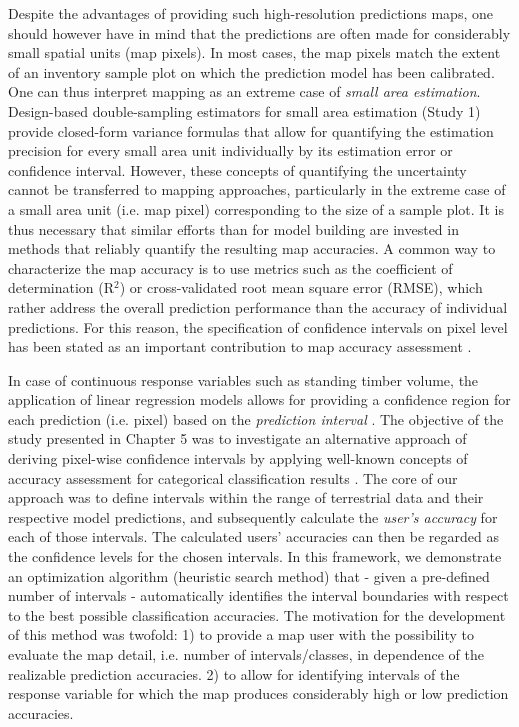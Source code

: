 Despite the advantages of providing such high-resolution predictions maps, one should however have in mind that the predictions are often made for considerably small spatial units (map pixels). In most cases, the map pixels match the extent of an inventory sample plot on which the prediction model has been calibrated. One can thus interpret mapping as an extreme case of \textit{small area estimation}. Design-based double-sampling estimators for small area estimation (Study 1) provide closed-form variance formulas that allow for quantifying the estimation precision for every small area unit individually by its estimation error or confidence interval. However, these concepts of quantifying the uncertainty cannot be transferred to mapping approaches, particularly in the extreme case of a small area unit (i.e. map pixel) corresponding to the size of a sample plot. It is thus necessary that similar efforts than for model building are invested in methods that reliably quantify the resulting map accuracies. A common way to characterize the map accuracy is to use metrics such as the coefficient of determination (R$^2$) or cross-validated root mean square error (RMSE), which rather address the overall prediction performance than the accuracy of individual predictions. For this reason, the specification of confidence intervals on pixel level has been stated as an important contribution to map accuracy assessment \citep{mcroberts2010a}.\par

In case of continuous response variables such as standing timber volume, the application of linear regression models allows for providing a confidence region for each prediction (i.e. pixel) based on the \textit{prediction interval} \citep[pp.136--139]{fahrmeir2013}. The objective of the study presented in Chapter 5 was to investigate an alternative approach of deriving pixel-wise confidence intervals by applying well-known concepts of accuracy assessment for categorical classification results \citep{congalton2008}. The core of our approach was to define intervals within the range of terrestrial data and their respective model predictions, and subsequently calculate the \textit{user's accuracy} for each of those intervals. The calculated users' accuracies can then be regarded as the confidence levels for the chosen intervals. In this framework, we demonstrate an optimization algorithm (heuristic search method) that - given a pre-defined number of intervals - automatically identifies the interval boundaries with respect to the best possible classification accuracies. The motivation for the development of this method was twofold: 1) to provide a map user with the possibility to evaluate the map detail, i.e. number of intervals/classes, in dependence of the realizable prediction accuracies. 2) to allow for identifying intervals of the response variable for which the map produces considerably high or low prediction accuracies.\par 

